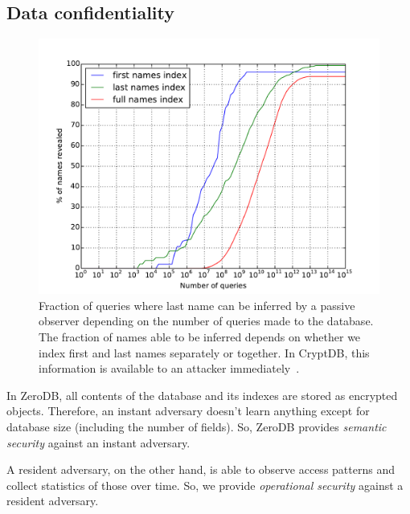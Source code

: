 \documentclass[notitlepage,longbibliography]{revtex4-1}
\begin{document}
\subsection{Data confidentiality}

\begin{figure}
	\begin{center}
        \includegraphics[width=0.7\columnwidth]{surname-attack.pdf}
	\end{center}
    \caption{
        Fraction of queries where last name can be inferred by a passive observer depending on the number of queries made to the database.
        The fraction of names able to be inferred depends on whether we index first and last names separately or together.
        In CryptDB, this information is available to an attacker immediately~\cite{cryptdb}.
    }
	\label{fig:surname-attack}
\end{figure}

In ZeroDB, all contents of the database and its indexes are stored as encrypted objects.
Therefore, an instant adversary doesn't learn anything except for database size (including the number of fields).
So, ZeroDB provides \emph{semantic security} against an instant adversary.

A resident adversary, on the other hand, is able to observe access patterns and collect statistics of those over time.
So, we provide \emph{operational security} against a resident adversary.
\end{document}
